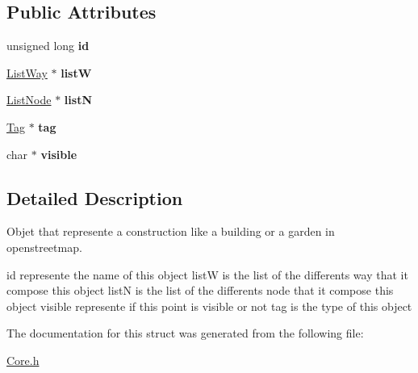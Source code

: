 \subsection*{Public Attributes}
\begin{DoxyCompactItemize}
\item 
\hypertarget{structRelation_a3f70b867d03c79bfa4dc98516ef1c25f}{unsigned long {\bfseries id}}\label{structRelation_a3f70b867d03c79bfa4dc98516ef1c25f}

\item 
\hypertarget{structRelation_a9a569cd7a800102a952b61bafe3f5fa7}{\hyperlink{structListWay}{List\-Way} $\ast$ {\bfseries list\-W}}\label{structRelation_a9a569cd7a800102a952b61bafe3f5fa7}

\item 
\hypertarget{structRelation_a55c4f77df17c7ab272ee93db476e8c8f}{\hyperlink{structListNode}{List\-Node} $\ast$ {\bfseries list\-N}}\label{structRelation_a55c4f77df17c7ab272ee93db476e8c8f}

\item 
\hypertarget{structRelation_af672e16f4fb0a93645b784e171f991d4}{\hyperlink{structTag}{Tag} $\ast$ {\bfseries tag}}\label{structRelation_af672e16f4fb0a93645b784e171f991d4}

\item 
\hypertarget{structRelation_a54cd0470aa40ddc3872899edcdd70eb1}{char $\ast$ {\bfseries visible}}\label{structRelation_a54cd0470aa40ddc3872899edcdd70eb1}

\end{DoxyCompactItemize}


\subsection{Detailed Description}
Objet that represente a construction like a building or a garden in openstreetmap. 

id represente the name of this object list\-W is the list of the differents way that it compose this object list\-N is the list of the differents node that it compose this object visible represente if this point is visible or not tag is the type of this object 

The documentation for this struct was generated from the following file\-:\begin{DoxyCompactItemize}
\item 
\hyperlink{Core_8h}{Core.\-h}\end{DoxyCompactItemize}
